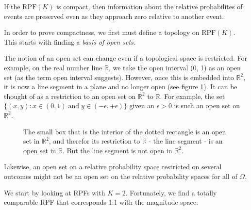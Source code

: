 \documentclass[twoside]{article}
\theoremstyle{plain}%
\theoremstyle{definition}
\theoremstyle{remark}
\begin{document}
If the \(\text{RPF}(K)\) is compact, then information about the relative probabilites of events are preserved even as they approach zero relative to another event.

In order to prove compactness, we first must define a topology on \(\text{RPF}(K)\). This starts with finding a \textit{basis of open sets}.

The notion of an open set can change even if a topological space is restricted. For example, on the real number line \(\mathbb{R}\), we take the open interval (0, 1) as an open set (as the term open interval suggests). However, once this is embedded into \(\mathbb{R}^2\), it is now a line segment in a plane and no longer open (see figure \ref{fig:sub_topology}). It can be thought of as a restriction to an open set on \(\mathbb{R}^2\) to \(\mathbb{R}\). For example, the set \(\{(x, y): x \in (0, 1)\;  \text{and}\;  y \in (-\epsilon, +\epsilon)\}\) given an \(\epsilon > 0\) is such an open set on \(\mathbb{R}^2\).

\begin{figure}[h]
\centering
{}
\caption{The small box that is the interior of the dotted rectangle is an open set in \(\mathbb{R}^2\), and therefor its restriction to \(\mathbb{R}\) - the line segment - is an open set in \(\mathbb{R}\). But the line segment is not open in \(\mathbb{R}^2\).}
\label{fig:sub_topology}
\end{figure}


Likewise, an open set on a relative probability space restricted on several outcomes might not be an open set on the relative probability spaces for all of \(\Omega\).

We start by looking at RPFs with \(K = 2\). Fortunately, we find a totally comparable RPF that corresponds 1:1 with the magnitude space.
\end{document}
